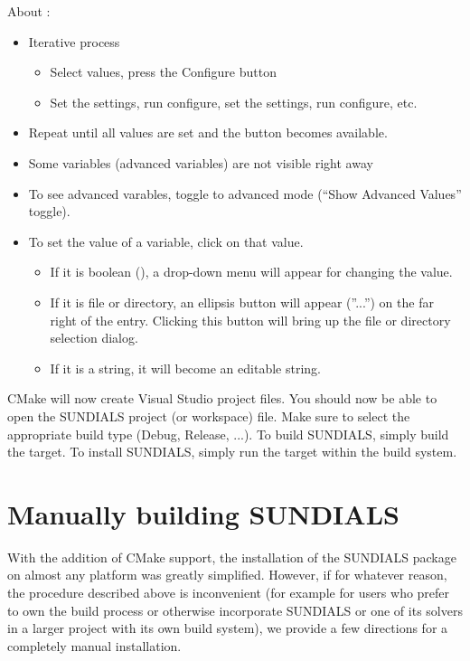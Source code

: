 \documentclass[letterpaper,10pt,english]{sphinxmanual}
\begin{document}
About :
\begin{itemize}
\item {} 
Iterative process
\begin{itemize}
\item {} 
Select values, press the Configure button

\item {} 
Set the settings, run configure, set the settings, run configure,
etc.

\end{itemize}

\item {} 
Repeat until all values are set and the  button becomes available.

\item {} 
Some variables (advanced variables) are not visible right away

\item {} 
To see advanced varables, toggle to advanced mode (``Show Advanced
Values'' toggle).

\item {} 
To set the value of a variable, click on that value.
\begin{itemize}
\item {} 
If it is boolean (), a drop-down menu will appear for
changing the value.

\item {} 
If it is file or directory, an ellipsis button will appear (''...'')
on the far right of the entry.  Clicking this button will bring up
the file or directory selection dialog.

\item {} 
If it is a string, it will become an editable string.

\end{itemize}

\end{itemize}

CMake will now create Visual Studio project files. You should now be
able to open the SUNDIALS project (or workspace) file. Make sure to
select the appropriate build type (Debug, Release, ...). To build
SUNDIALS, simply build the  target. To install SUNDIALS,
simply run the  target within the build system.


\section{Manually building SUNDIALS}
\label{Install:installation-manual}\label{Install:manually-building-sundials}
With the addition of CMake support, the installation of the SUNDIALS
package on almost any platform was greatly simplified.  However, if for
whatever reason, the procedure described above is
inconvenient (for example for users who prefer to own the build process
or otherwise incorporate SUNDIALS or one of its solvers in a larger
project with its own build system), we provide a few directions
for a completely manual installation.
\end{document}
